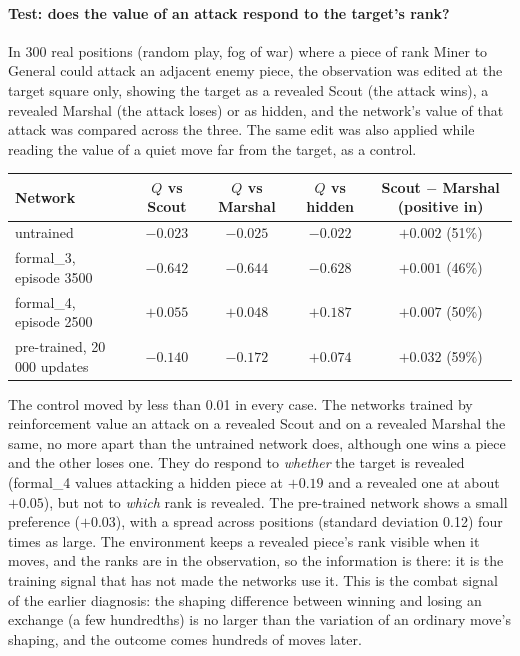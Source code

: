 \paragraph{Test: does the value of an attack respond to the target's rank?} In 300 real
positions (random play, fog of war) where a piece of rank Miner to General could attack an
adjacent enemy piece, the observation was edited at the target square only, showing the target
as a revealed Scout (the attack wins), a revealed Marshal (the attack loses) or as hidden, and the
network's value of that attack was compared across the three. The same edit was also applied
while reading the value of a quiet move far from the target, as a control.
\begin{center}
\begin{tabular}{lcccc}
\toprule
Network & $Q$ vs Scout & $Q$ vs Marshal & $Q$ vs hidden & Scout $-$ Marshal (positive in) \\
\midrule
untrained               & $-0.023$ & $-0.025$ & $-0.022$ & $+0.002$ (51\%) \\
formal\_3, episode 3500  & $-0.642$ & $-0.644$ & $-0.628$ & $+0.001$ (46\%) \\
formal\_4, episode 2500  & $+0.055$ & $+0.048$ & $+0.187$ & $+0.007$ (50\%) \\
pre-trained, 20\,000 updates & $-0.140$ & $-0.172$ & $+0.074$ & $+0.032$ (59\%) \\
\bottomrule
\end{tabular}
\end{center}
The control moved by less than 0.01 in every case. The networks trained by reinforcement value
an attack on a revealed Scout and on a revealed Marshal the same, no more apart than the untrained
network does, although one wins a piece and the other loses one. They do respond to \emph{whether}
the target is revealed (formal\_4 values attacking a hidden piece at $+0.19$ and a revealed one at
about $+0.05$), but not to \emph{which} rank is revealed. The pre-trained network shows a small
preference ($+0.03$), with a spread across positions (standard deviation 0.12) four times as
large. The environment keeps a revealed piece's rank visible when it moves, and the ranks are in
the observation, so the information is there: it is the training signal that has not made the
networks use it. This is the combat signal of the earlier diagnosis: the shaping difference
between winning and losing an exchange (a few hundredths) is no larger than the variation of
an ordinary move's shaping, and the outcome comes hundreds of moves later.

